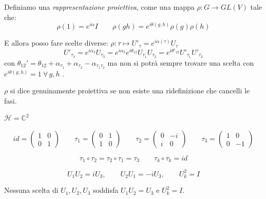 \begin{definition}
    Definiamo una \textit{rappresentazione proiettiva}, come una mappa \(\rho: G \to GL(V)\) tale che:
    \[
        \rho(1) = e^{i\alpha}I \qquad \rho(gh)= e^{i\theta(g,h)} \rho(g)\rho(h)
    \]
\end{definition}

E allora posso fare scelte diverse: \( \rho : \tau \mapsto U'_\tau = e^{i\alpha(\tau)}U_\tau\)
\[
    U'_{\tau_3} = e^{i\alpha_3} U_{\tau_3}= e^{i\alpha_3}e^{i\theta_{12}}U_{\tau_{1}}U_{\tau_2}= 
    e^{i\theta'_{12}}U'_{\tau_1}U'_{\tau_2}
\]
con \(\theta_{12}' = \theta_{12} + \alpha_{\tau_1} + \alpha_{\tau_2} - \alpha_{\tau_1\tau_2}\)
ma non si potrà sempre trovare una scelta con \(e^{i\theta(g,h)}=1 \ \forall\, g,h\) .

\begin{definition}
    \(\rho\) si dice genuinamente proiettiva se non esiste una ridefinizione che cancelli le fasi.
\end{definition}


\begin{example}
    \(\mathcal{H} = \mathbb{C}^2\)

    \[
        id = 
        \begin{pmatrix}
            1 & 0\\
            0 & 1
        \end{pmatrix}
        \qquad
        \tau_1 =
        \begin{pmatrix}
            0 & 1\\
            1 & 0
        \end{pmatrix}
        \qquad
        \tau_2 =
        \begin{pmatrix}
            0 & -i\\
            i & 0
        \end{pmatrix}
        \qquad
        \tau_3 =
        \begin{pmatrix}
            1 & 0\\
            0 & -1
        \end{pmatrix}
    \]

    \[
        \tau_1 \circ \tau_2 = \tau_2 \circ \tau_1 = \tau_3
        \qquad
        \tau_k \circ \tau_k = id
    \]

    \[
        U_1U_2 = iU_3, \qquad U_2U_1 = -iU_3, \qquad U_k^2 = I
    \]

    Nessuna scelta di \(U_1, U_2, U_3\) soddisfa \(U_1U_2=U_3\) e \(U_k^2=I\).
\end{example}


